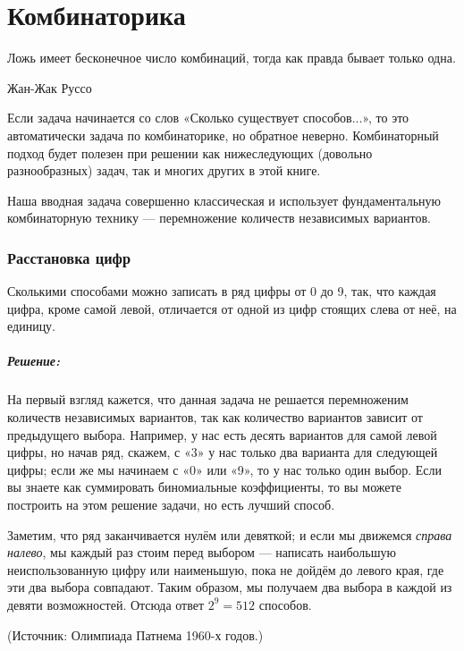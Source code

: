 \chapter*{Комбинаторика}

\epigraph{Ложь имеет бесконечное число комбинаций,
тогда как правда бывает только одна.}{Жан-Жак Руссо}

 
 
Если задача начинается со слов «Сколько существует способов...», то это автоматически задача по комбинаторике, но обратное неверно.
Комбинаторный подход будет полезен при решении как нижеследующих (довольно разнообразных) задач, так и многих других в этой книге.

Наша вводная задача совершенно классическая и использует фундаментальную
комбинаторную технику --- перемножение количеств независимых вариантов.

\subsection*{Расстановка цифр}%

Сколькими способами можно записать в ряд цифры от 0 до 9, так, что каждая цифра, кроме самой левой, отличается от одной из цифр стоящих слева от неё, на единицу.

\paragraph{Решение:} На первый взгляд кажется, что данная задача не решается перемноженим количеств независимых вариантов, так как количество вариантов зависит от предыдущего выбора.
Например, у нас есть десять вариантов для самой левой цифры,
но начав ряд, скажем, с «3» у нас только два варианта для следующей цифры; если же мы начинаем с «0» или «9», то у нас только один выбор.
Если вы знаете как суммировать биномиальные коэффициенты, то вы можете построить на этом решение задачи, но есть лучший способ.

Заметим, что ряд заканчивается нулём или девяткой; и если мы движемся \emph{справа налево}, мы каждый раз стоим перед выбором --- написать наибольшую неиспользованную цифру или наименьшую, пока не дойдём до левого края, где эти два выбора совпадают.
Таким образом, мы получаем два выбора в каждой из девяти возможностей.
Отсюда ответ $2^9=512$ способов.\heart

(Источник: Олимпиада Патнема 1960-х годов.)%

\bigskip

